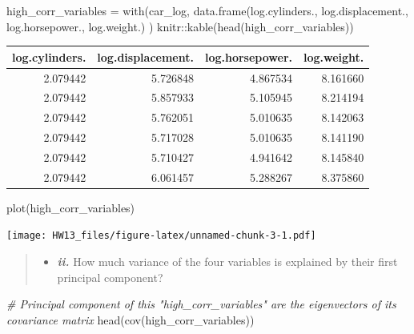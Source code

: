 \documentclass[
]{article}
\newenvironment{Shaded}{\begin{snugshade}}{\end{snugshade}}
\newcommand{\CommentTok}[1]{\textcolor[rgb]{0.56,0.35,0.01}{\textit{#1}}}
\newcommand{\FunctionTok}[1]{\textcolor[rgb]{0.00,0.00,0.00}{#1}}
\newcommand{\NormalTok}[1]{#1}
\newcommand{\OtherTok}[1]{\textcolor[rgb]{0.56,0.35,0.01}{#1}}
\newcommand{\SpecialCharTok}[1]{\textcolor[rgb]{0.00,0.00,0.00}{#1}}
\providecommand{\tightlist}{%
  \setlength{\itemsep}{0pt}\setlength{\parskip}{0pt}}
\begin{document}
\begin{Shaded}
\begin{Highlighting}[]
\NormalTok{high\_corr\_variables }\OtherTok{=} \FunctionTok{with}\NormalTok{(car\_log, }\FunctionTok{data.frame}\NormalTok{(log.cylinders.,}
\NormalTok{                                               log.displacement.,}
\NormalTok{                                               log.horsepower.,}
\NormalTok{                                               log.weight.)}
\NormalTok{)}
\NormalTok{knitr}\SpecialCharTok{::}\FunctionTok{kable}\NormalTok{(}\FunctionTok{head}\NormalTok{(high\_corr\_variables))}
\end{Highlighting}
\end{Shaded}

\begin{longtable}[]{@{}rrrr@{}}
\toprule
log.cylinders. & log.displacement. & log.horsepower. & log.weight. \\
\midrule
\endhead
2.079442 & 5.726848 & 4.867534 & 8.161660 \\
2.079442 & 5.857933 & 5.105945 & 8.214194 \\
2.079442 & 5.762051 & 5.010635 & 8.142063 \\
2.079442 & 5.717028 & 5.010635 & 8.141190 \\
2.079442 & 5.710427 & 4.941642 & 8.145840 \\
2.079442 & 6.061457 & 5.288267 & 8.375860 \\
\bottomrule
\end{longtable}

\begin{Shaded}
\begin{Highlighting}[]
\FunctionTok{plot}\NormalTok{(high\_corr\_variables)}
\end{Highlighting}
\end{Shaded}

\texttt{[image: HW13\_files/figure-latex/unnamed-chunk-3-1.pdf]}

\begin{quote}
\begin{itemize}
\tightlist
\item
  \textbf{\emph{ii.}} How much variance of the four variables is
  explained by their first principal component?
\end{itemize}
\end{quote}

\begin{Shaded}
\begin{Highlighting}[]
\CommentTok{\# Principal component of this "high\_corr\_variables" are the eigenvectors of its covariance matrix}
\FunctionTok{head}\NormalTok{(}\FunctionTok{cov}\NormalTok{(high\_corr\_variables))}
\end{Highlighting}
\end{Shaded}
\end{document}
